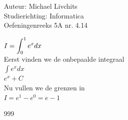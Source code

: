 \documentclass[a4paper]{article}
\newcommand{\dint}{\displaystyle\int}
\begin{document}
  
\noindent \large Auteur: Michael Livchits \\
\noindent \large Studierichting: Informatica\\
\noindent \large Oefeningenreeks 5A nr. 4.14\\

\medskip

\normalsize

$I = \displaystyle\dint_{0}^1 e^xdx$\\

Eerst vinden we de onbepaalde integraal\\

$\displaystyle\int e^xdx$\\

$ e^x + C$\\

Nu vullen we de grenzen in\\

$I = e^1-e^0 = e - 1$\\

\begin{thebibliography}{999}
\end{thebibliography}
\end{document}
